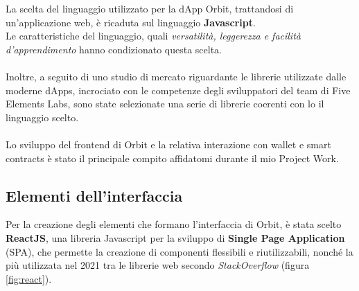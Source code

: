 \documentclass[12pt,a4paper]{report}
\begin{document}
La scelta del linguaggio utilizzato per la dApp Orbit, trattandosi di un'applicazione web, è ricaduta sul linguaggio \textbf{Javascript}\cite{js}.\\Le caratteristiche del linguaggio, quali \textit{versatilità, leggerezza e facilità d'apprendimento} hanno condizionato questa scelta.
\\\\Inoltre, a seguito di uno studio di mercato riguardante le librerie utilizzate dalle moderne dApps, incrociato con le competenze degli sviluppatori del team di Five Elements Labs, sono state selezionate una serie di librerie coerenti con lo il linguaggio scelto.
\\\\Lo sviluppo del frontend di Orbit e la relativa interazione con wallet e smart contracts è stato il principale compito affidatomi durante il mio Project Work.

\subsection{Elementi dell'interfaccia}

Per la creazione degli elementi che formano l'interfaccia di Orbit, è stata scelto \textbf{ReactJS}\cite{react}, una libreria Javascript per la sviluppo di \textbf{Single Page Application} (SPA\cite{spa}), che permette la creazione di componenti flessibili e riutilizzabili, nonché la più utilizzata nel 2021 tra le librerie web secondo \textit{StackOverflow}\cite{react_2021} (figura \ref{fig:react}).
\end{document}
